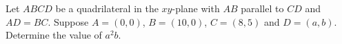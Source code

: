 Let $ABCD$ be a quadrilateral in the $xy$-plane with $AB$ parallel to $CD$ and $AD = BC$. Suppose $A = (0, 0)$, $B = (10, 0)$, $C = (8, 5)$ and $D = (a, b)$. Determine the value of $a^2b$.
